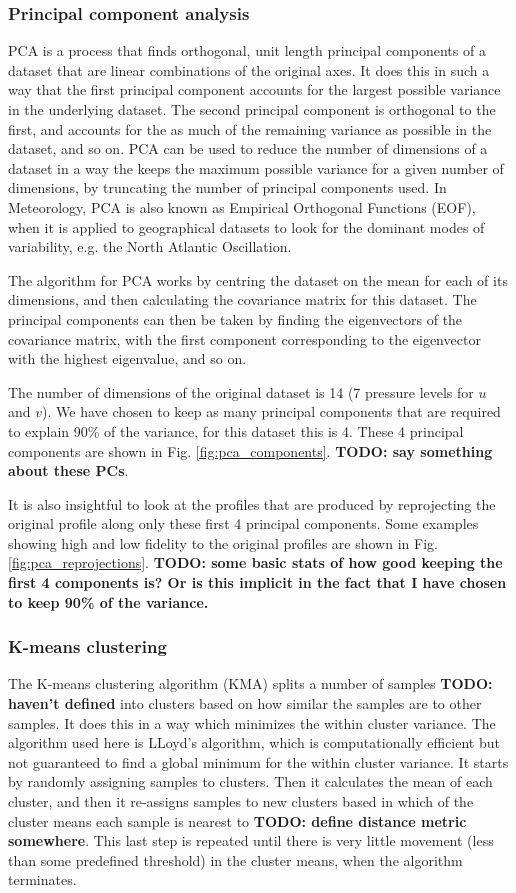 \documentclass{article}
\newcommand\todo[1]{\textbf{TODO: #1}}
\begin{document}
\subsubsection{Principal component analysis}

PCA is a process that finds orthogonal, unit length principal components of a dataset that are linear combinations of the original axes. It does this in such a way that the first principal component accounts for the largest possible variance in the underlying dataset. The second principal component is orthogonal to the first, and accounts for the as much of the remaining variance as possible in the dataset, and so on. PCA can be used to reduce the number of dimensions of a dataset in a way the keeps the maximum possible variance for a given number of dimensions, by truncating the number of principal components used. In Meteorology, PCA is also known as Empirical Orthogonal Functions (EOF), when it is applied to geographical datasets to look for the dominant modes of variability, e.g. the North Atlantic Oscillation.

The algorithm for PCA works by centring the dataset on the mean for each of its dimensions, and then calculating the covariance matrix for this dataset. The principal components can then be taken by finding the eigenvectors of the covariance matrix, with the first component corresponding to the eigenvector with the highest eigenvalue, and so on. 

The number of dimensions of the original dataset is 14 (7 pressure levels for $u$ and $v$). We have chosen to keep as many principal components that are required to explain 90\% of the variance, for this dataset this is 4. These 4 principal components are shown in Fig. \ref{fig:pca_components}. \todo{say something about these PCs}.

It is also insightful to look at the profiles that are produced by reprojecting the original profile along only these first 4 principal components. Some examples showing high and low fidelity to the original profiles are shown in Fig. \ref{fig:pca_reprojections}. \todo{some basic stats of how good keeping the first 4 components is? Or is this implicit in the fact that I have chosen to keep 90\% of the variance.}

\subsubsection{K-means clustering}

The K-means clustering algorithm (KMA) splits a number of samples \todo{haven't defined} into clusters based on how similar the samples are to other samples. It does this in a way which minimizes the within cluster variance. The algorithm used here is LLoyd's algorithm, which is computationally efficient but not guaranteed to find a global minimum for the within cluster variance. It starts by randomly assigning samples to clusters. Then it calculates the mean of each cluster, and then it re-assigns samples to new clusters based in which of the cluster means each sample is nearest to \todo{define distance metric somewhere}. This last step is repeated until there is very little movement (less than some predefined threshold) in the cluster means, when the algorithm terminates.
\end{document}
